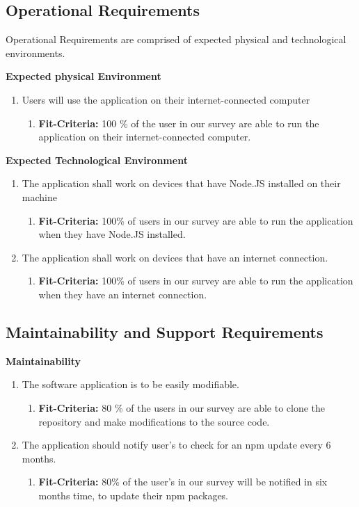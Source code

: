 \documentclass{article}
\begin{document}
\subsection{Operational Requirements}
Operational Requirements are comprised of expected physical and technological environments. \newline

\textbf{Expected physical Environment }
\begin{enumerate}
\item Users will use the application on their internet-connected computer 
   \begin{enumerate}
    \item \textbf{Fit-Criteria:}  100 \% of the user in our survey are able to run the application on their internet-connected computer. 
    \end{enumerate}
\end{enumerate}

\noindent
\textbf{Expected Technological Environment }
\begin{enumerate}
\item The application shall work on devices that have Node.JS installed on their machine 
   \begin{enumerate}
    \item \textbf{Fit-Criteria:}  100\% of users in our survey are able to run the application when they have Node.JS installed. 
    \end{enumerate}
\item The application shall work on devices that have an internet connection. 
   \begin{enumerate}
    \item \textbf{Fit-Criteria:}   100\% of users in our survey are able to run the application when they have an internet connection. 
    \end{enumerate}
\end{enumerate}


\subsection{Maintainability and Support Requirements}
\textbf{Maintainability} 
\begin{enumerate}
\item The software application is to be easily modifiable.
   \begin{enumerate}
    \item \textbf{Fit-Criteria:}  80 \% of the users in our survey are able to clone the repository and make modifications to the source code. 
    \end{enumerate}
\item The application should notify user's to check for an npm update every 6 months. 
   \begin{enumerate}
    \item \textbf{Fit-Criteria:}  80\% of the user's in our survey will be notified in six months time, to update their npm packages. 
    \end{enumerate}
\end{enumerate}
\end{document}

